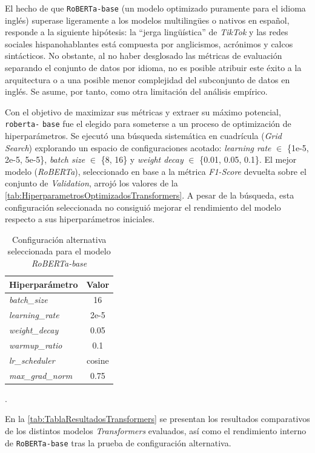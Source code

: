 El hecho de que \texttt{RoBERTa-base} (un modelo optimizado puramente para el idioma inglés) superase ligeramente a los modelos multilingües o nativos en español, responde a la siguiente hipótesis: la ``jerga lingüística'' de \textit{TikTok} y las redes sociales hispanohablantes está compuesta por anglicismos, acrónimos y calcos sintácticos. No obstante, al no haber desglosado las métricas de evaluación separando el conjunto de datos por idioma, no es posible atribuir este éxito a la arquitectura o a una posible menor complejidad del subconjunto de datos en inglés. Se asume, por tanto, como otra limitación del análisis empírico. 

Con el objetivo de maximizar sus métricas y extraer su máximo potencial, \texttt{roberta-} \texttt{base} fue el elegido para someterse a un proceso de optimización de hiperparámetros. Se ejecutó una búsqueda sistemática en cuadrícula (\textit{Grid Search}) explorando un espacio de configuraciones acotado: \textit{learning rate} $\in$ \{1e-5, 2e-5, 5e-5\}, \textit{batch size} $\in$ \{8, 16\} y \textit{weight decay} $\in$ \{0.01, 0.05, 0.1\}. El mejor modelo (\textit{RoBERTa}), seleccionado en base a la métrica \textit{F1-Score} devuelta sobre el conjunto de \textit{Validation}, arrojó los valores de la \autoref{tab:HiperparametrosOptimizadosTransformers}. A pesar de la búsqueda, esta configuración seleccionada no consiguió mejorar el rendimiento del modelo respecto a sus hiperparámetros iniciales. 

\begin{table}[H]
    \centering
    \begin{tabular}{lc}
        \toprule
        \textbf{Hiperparámetro} & \textbf{Valor} \\
        \midrule
        \textit{batch\_size} & 16 \\
        \textit{learning\_rate} & 2e-5 \\
        \textit{weight\_decay} & 0.05 \\
        \textit{warmup\_ratio} & 0.1 \\
        \textit{lr\_scheduler} & cosine \\
        \textit{max\_grad\_norm} & 0.75 \\
        \bottomrule
    \end{tabular}
    \caption{Configuración alternativa seleccionada para el modelo  \textit{RoBERTa-base}}.
    \label{tab:HiperparametrosOptimizadosTransformers}
\end{table}

En la \autoref{tab:TablaResultadosTransformers} se presentan los resultados comparativos de los distintos modelos \textit{Transformers} evaluados, así como el rendimiento interno de \texttt{RoBERTa-base} tras la prueba de configuración alternativa. 

